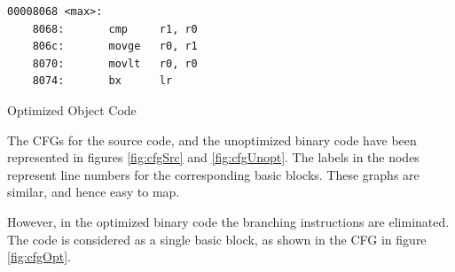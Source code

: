 \begin{Example}[h]
\begin{lstlisting}
00008068 <max>:
    8068:       cmp     r1, r0
    806c:       movge   r0, r1
    8070:       movlt   r0, r0
    8074:       bx      lr
\end{lstlisting}
\caption{Optimized Object Code}
\label{ex:objOptimizedIfElse}
\end{Example}

The CFGs for the source code, and the unoptimized binary code have been represented in figures \ref{fig:cfgSrc} and \ref{fig:cfgUnopt}. The labels in the nodes represent line numbers for the corresponding basic blocks. These graphs are similar, and hence easy to map. 

However, in the optimized binary code the branching instructions are eliminated. The code is considered as a single basic block, as shown in the CFG in figure \ref{fig:cfgOpt}.

